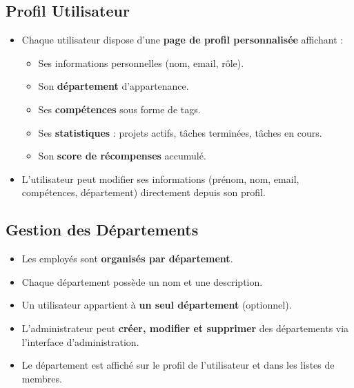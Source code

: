 \documentclass[11pt,a4paper]{report}
\begin{document}
\subsection{Profil Utilisateur}
\begin{tcolorbox}[enhanced, colback=lightgray, colframe=primarycolor, arc=2mm, boxrule=0.5pt, breakable]
    \begin{itemize}
        \item Chaque utilisateur dispose d'une \textbf{page de profil personnalisée} affichant :
              \begin{itemize}
                  \item Ses informations personnelles (nom, email, rôle).
                  \item Son \textbf{département} d'appartenance.
                  \item Ses \textbf{compétences} sous forme de tags.
                  \item Ses \textbf{statistiques} : projets actifs, tâches terminées, tâches en cours.
                  \item Son \textbf{score de récompenses} accumulé.
              \end{itemize}
        \item L'utilisateur peut modifier ses informations (prénom, nom, email, compétences, département) directement depuis son profil.
    \end{itemize}
\end{tcolorbox}

\subsection{Gestion des Départements}
\begin{tcolorbox}[enhanced, colback=lightgray, colframe=primarycolor, arc=2mm, boxrule=0.5pt, breakable]
    \begin{itemize}
        \item Les employés sont \textbf{organisés par département}.
        \item Chaque département possède un nom et une description.
        \item Un utilisateur appartient à \textbf{un seul département} (optionnel).
        \item L'administrateur peut \textbf{créer, modifier et supprimer} des départements via l'interface d'administration.
        \item Le département est affiché sur le profil de l'utilisateur et dans les listes de membres.
    \end{itemize}
\end{tcolorbox}
\end{document}
